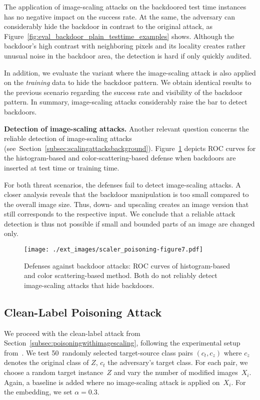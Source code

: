 \documentclass[conference]{IEEEtran}
\renewcommand{\paragraph}[1]{{\vskip 8pt \noindent\bf #1 }}
\newcommand{\ti}{\ensuremath{Z}\xspace}
\begin{document}
The application of image-scaling attacks on the backdoored test time 
instances has no negative impact on the success rate.
At the same, the adversary can considerably hide the backdoor in 
contrast to the original attack, as 
Figure~\ref{fig:eval_backdoor_plain_testtime_examples} shows.
Although the backdoor's high contrast with neighboring pixels and its 
locality creates rather unusual noise in the backdoor area, the 
detection is hard if only quickly audited.

In addition, we evaluate the variant where the image-scaling attack is 
also applied on the \emph{training} data to hide the backdoor pattern. 
We obtain identical results to the previous scenario regarding the 
success rate and visibility of the backdoor pattern. 
In summary, image-scaling attacks considerably raise the bar 
to detect backdoors.

\paragraph{Detection of image-scaling attacks.}
Another relevant question concerns the reliable detection of 
image-scaling attacks 
(see~Section~\ref{subsec:scalingattacksbackground}). 
Figure~\ref{fig:results_detection} depicts ROC curves for the 
histogram-based and color-scattering-based defense when backdoors are 
inserted at test time or training time.

For both threat scenarios, the defenses {fail\EndAccSupp{}} to detect image-scaling 
attacks. 
A closer analysis reveals that the backdoor manipulation is too small 
compared to the overall image size. Thus, down- and upscaling creates 
an image version that still corresponds to the respective input. We 
conclude that a reliable attack detection is thus not possible if small 
and bounded parts of an image are changed only.

\begin{figure}
	\centering
	\texttt{[image: ./ext\_images/scaler\_poisoning-figure7.pdf]}
	\vspace{-0.7em}
	\caption{Defenses against backdoor attacks: ROC curves of 
	histogram-based and color scattering-based method. Both do 
	not reliably detect image-scaling attacks that hide backdoors.}
	\label{fig:results_detection}
\end{figure}


\subsection{Clean-Label Poisoning Attack}
We proceed with the clean-label attack from
Section~\ref{subsec:poisoningwithimagescaling}, following the 
experimental setup from~\citet{ShaHuaNaj+18}. 
We test 50~randomly selected target-source class pairs $(c_t, c_z)$ 
where $c_z$ denotes the original class of $\ti$, $c_t$ the adversary's 
target class. For each pair, we choose a random target instance~\ti 
and vary the number of modified images~$X_i$. Again, a baseline is 
added where no image-scaling attack is applied on~$X_i$. For the 
embedding, we set $\alpha=0.3$.
\end{document}
